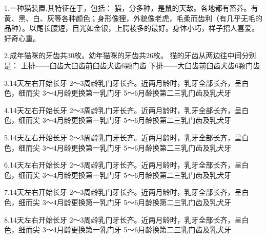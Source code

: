 \setcounter{page}{1}

\begin{large}
    1.一种猫装置,其特征在于，包括：
    猫，分多种，是鼠的天敌。各地都有畜养。有黄、黑、白、灰等各种颜色；身形像狸，外貌像老虎，毛柔而齿利（有几乎无毛的品种）。以尾长腰短，目光如金银，上腭棱多的最好。身体小巧，样子招人喜爱。好奇心重。

    2.成年猫咪的牙齿共30枚。幼年猫咪的牙齿共26枚。
    猫的牙齿从两边往中间分别是：
    上排——臼齿大臼齿前臼齿犬齿6颗门齿
    下排——大臼齿前臼齿犬齿6颗门齿

    3.14天左右开始长牙
    2～3周龄乳门牙长齐。近两月龄时，乳牙全部长齐，呈白色，细而尖
    3～4月龄更换第一乳门牙
    5～6月龄换第二三乳门齿及乳犬牙

    4.14天左右开始长牙
    2～3周龄乳门牙长齐。近两月龄时，乳牙全部长齐，呈白色，细而尖
    3～4月龄更换第一乳门牙
    5～6月龄换第二三乳门齿及乳犬牙

    5.14天左右开始长牙
    2～3周龄乳门牙长齐。近两月龄时，乳牙全部长齐，呈白色，细而尖
    3～4月龄更换第一乳门牙
    5～6月龄换第二三乳门齿及乳犬牙

    6.14天左右开始长牙
    2～3周龄乳门牙长齐。近两月龄时，乳牙全部长齐，呈白色，细而尖
    3～4月龄更换第一乳门牙
    5～6月龄换第二三乳门齿及乳犬牙

    7.14天左右开始长牙
    2～3周龄乳门牙长齐。近两月龄时，乳牙全部长齐，呈白色，细而尖
    3～4月龄更换第一乳门牙
    5～6月龄换第二三乳门齿及乳犬牙

    8.14天左右开始长牙
    2～3周龄乳门牙长齐。近两月龄时，乳牙全部长齐，呈白色，细而尖
    3～4月龄更换第一乳门牙
    5～6月龄换第二三乳门齿及乳犬牙

\end{large}